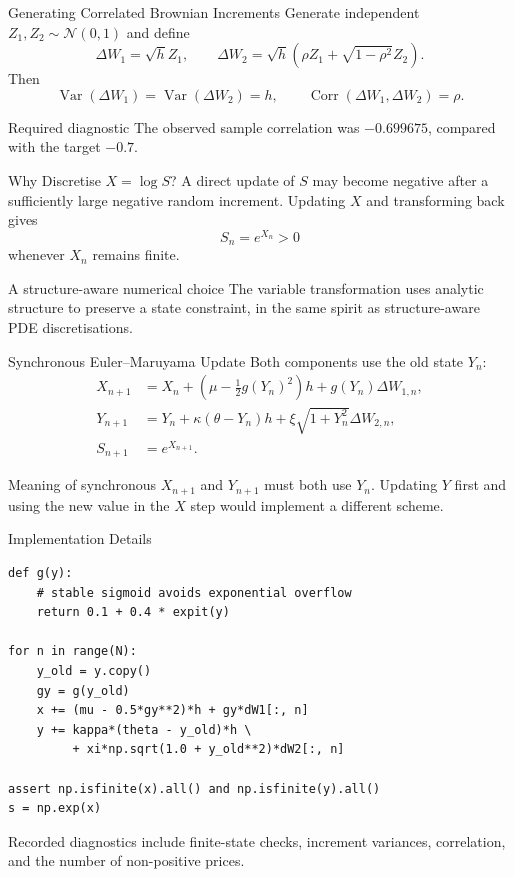 \documentclass[aspectratio=169,10pt]{beamer}
\newcommand{\Var}{\operatorname{Var}}
\newcommand{\Normal}{\mathcal{N}}
\begin{document}
\begin{frame}{Generating Correlated Brownian Increments}
  Generate independent $Z_1,Z_2\sim\Normal(0,1)$ and define
  \[
    \Delta W_1=\sqrt h Z_1,\qquad
    \Delta W_2=\sqrt h\left(\rho Z_1+\sqrt{1-\rho^2}Z_2\right).
  \]
  Then
  \[
    \Var(\Delta W_1)=\Var(\Delta W_2)=h,\qquad
    \operatorname{Corr}(\Delta W_1,\Delta W_2)=\rho.
  \]
  \begin{alertblock}{Required diagnostic}
    The observed sample correlation was $-0.699675$, compared with the target $-0.7$.
  \end{alertblock}
\end{frame}

\begin{frame}{Why Discretise $X=\log S$?}
  A direct update of $S$ may become negative after a sufficiently large negative
  random increment. Updating $X$ and transforming back gives
  \[
    S_n=e^{X_n}>0
  \]
  whenever $X_n$ remains finite.
  \begin{block}{A structure-aware numerical choice}
    The variable transformation uses analytic structure to preserve a state constraint,
    in the same spirit as structure-aware PDE discretisations.
  \end{block}
\end{frame}

\begin{frame}{Synchronous Euler--Maruyama Update}
  Both components use the old state $Y_n$:
  \begin{align*}
    X_{n+1}&=X_n+\left(\mu-\frac12g(Y_n)^2\right)h
      +g(Y_n)\Delta W_{1,n},\\
    Y_{n+1}&=Y_n+\kappa(\theta-Y_n)h
      +\xi\sqrt{1+Y_n^2}\Delta W_{2,n},\\
    S_{n+1}&=e^{X_{n+1}}.
  \end{align*}
  \begin{alertblock}{Meaning of synchronous}
    $X_{n+1}$ and $Y_{n+1}$ must both use $Y_n$. Updating $Y$ first and using
    the new value in the $X$ step would implement a different scheme.
  \end{alertblock}
\end{frame}

\begin{frame}[fragile]{Implementation Details}
\begin{lstlisting}
def g(y):
    # stable sigmoid avoids exponential overflow
    return 0.1 + 0.4 * expit(y)

for n in range(N):
    y_old = y.copy()
    gy = g(y_old)
    x += (mu - 0.5*gy**2)*h + gy*dW1[:, n]
    y += kappa*(theta - y_old)*h \
         + xi*np.sqrt(1.0 + y_old**2)*dW2[:, n]

assert np.isfinite(x).all() and np.isfinite(y).all()
s = np.exp(x)
\end{lstlisting}
  \vspace{-0.4em}
  \small Recorded diagnostics include finite-state checks, increment variances,
  correlation, and the number of non-positive prices.
\end{frame}
\end{document}
